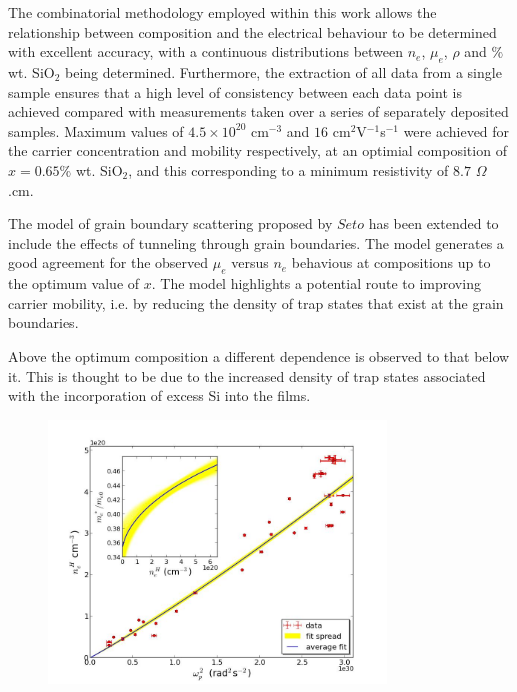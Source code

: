 \documentclass[aps,prl,preprint,showpacs,showkeys,linenumbers]{revtex4-1}
\begin{document}
The combinatorial methodology employed within this work allows the relationship between composition and the electrical behaviour to be determined with excellent accuracy, with a continuous distributions between $n_e$, $\mu_e$, $\rho$ and $\%$ wt. SiO$_{2}$ being determined. Furthermore, the extraction of all data from a single sample ensures that a high level of consistency between each data point is achieved compared with measurements taken over a series of separately deposited samples. Maximum values of $4.5\times10^{20}$ cm$^{-3}$ and $16$ cm$^{2}$V$^{-1}$s$^{-1}$ were achieved for the carrier concentration and mobility respectively, at an optimial composition of $x =0.65\%$ wt. SiO$_2$, and this corresponding to a minimum resistivity of $8.7$ $\Omega$.cm.

The model of grain boundary scattering proposed by $Seto$ \cite{Seto1975} has been extended to include the effects of tunneling through grain boundaries. The model generates a good agreement for the observed $\mu_e$ versus $n_e$ behavious at compositions up to the optimum value of $x$. The model highlights a potential route to improving carrier mobility, i.e. by reducing the density of trap states that exist at the grain boundaries.

Above the optimum composition a different dependence is observed to that below it. This is thought to be due to the increased density of trap states associated with the incorporation of excess Si into the films.
\begin{acknowledgements}

\end{acknowledgements}




\begin{figure}[0]
\centering
\caption{\label{fig:1}}
\end{figure}

\begin{figure}[p]
\centering
\caption{\label{fig:2}}
\end{figure}

\begin{figure}[p]
\centering
\includegraphics[width = 0.8\textwidth]{figure1c}
\caption{\label{fig:3}}
\end{figure}
\end{document}
